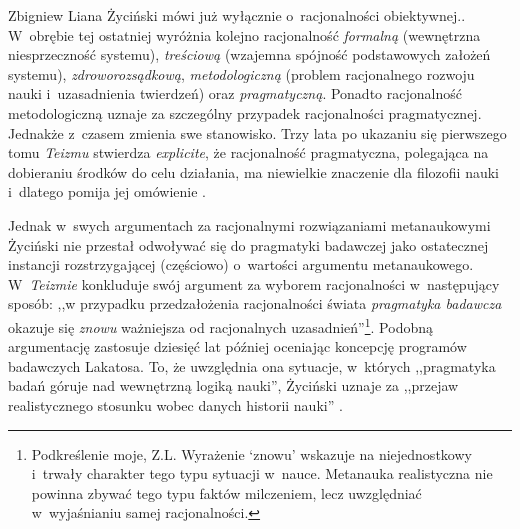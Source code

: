 \begin{artplenv}{Zbigniew Liana}
{%
\parencites*[][s.~248–251]{zycinski_elementy_1996}[][s.~336–340]{zycinski_elementy_2015} %
 Życiński mówi już wyłącznie o~racjonalności obiektywnej.}. W~obrębie tej ostatniej wyróżnia kolejno racjonalność \textit{formalną} (wewnętrzna niesprzeczność systemu), \textit{treściową} (wzajemna spójność podstawowych założeń systemu), \textit{zdroworozsądkową}, \textit{metodologiczną} (problem racjonalnego rozwoju nauki i~uzasadnienia twierdzeń) oraz \textit{pragmatyczną}. Ponadto racjonalność metodologiczną uznaje za szczególny przypadek racjonalności pragmatycznej. Jednakże z~czasem zmienia swe stanowisko. Trzy lata po ukazaniu się pierwszego tomu \textit{Teizmu} stwierdza \textit{explicite}, że racjonalność pragmatyczna, polegająca na dobieraniu środków do celu działania, ma niewielkie znaczenie dla filozofii nauki i~dlatego pomija jej omówienie 
\parencites[][s.~134]{zycinski_structure_1988}[][s.~237]{zycinski_struktura_2013_liana}.%


Jednak w~swych argumentach za racjonalnymi rozwiązaniami metanaukowymi Życiński nie przestał odwoływać się do pragmatyki badawczej jako ostatecznej instancji rozstrzygającej (częściowo) o~wartości argumentu metanaukowego. W~\textit{Teizmie}
\parencite*[][s.~194]{zycinski_teizm_1985} %
 konkluduje swój argument za wyborem racjonalności w~następujący sposób: ,,w przypadku przedzałożenia racjonalności świata \textit{pragmatyka badawcza} okazuje się \textit{znowu} ważniejsza od racjonalnych uzasadnień''\footnote{Podkreślenie moje, Z.L. Wyrażenie ‘znowu' wskazuje na niejednostkowy i~trwały charakter tego typu sytuacji w~nauce. Metanauka realistyczna nie powinna zbywać tego typu faktów milczeniem, lecz uwzględniać w~wyjaśnianiu samej racjonalności.}. Podobną argumentację zastosuje dziesięć lat później oceniając koncepcję programów badawczych Lakatosa. To, że uwzględnia ona sytuacje, w~których ,,pragmatyka badań góruje nad wewnętrzną logiką nauki'', Życiński uznaje za ,,przejaw realistycznego stosunku wobec danych historii nauki'' 
\parencites[][s.~243]{zycinski_elementy_1996}[][s.~330]{zycinski_elementy_2015}.%



\end{artplenv}
